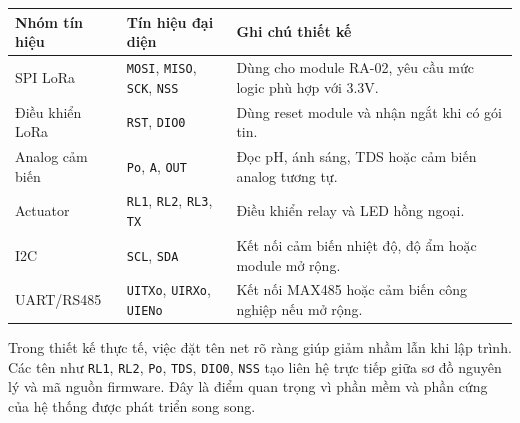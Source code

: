 \begin{longtable}{|p{3.2cm}|p{4cm}|p{5.8cm}|}
\hline
\textbf{Nhóm tín hiệu} & \textbf{Tín hiệu đại diện} & \textbf{Ghi chú thiết kế} \\
\hline
SPI LoRa & \texttt{MOSI}, \texttt{MISO}, \texttt{SCK}, \texttt{NSS} & Dùng cho module RA-02, yêu cầu mức logic phù hợp với 3.3V. \\
\hline
Điều khiển LoRa & \texttt{RST}, \texttt{DIO0} & Dùng reset module và nhận ngắt khi có gói tin. \\
\hline
Analog cảm biến & \texttt{Po}, \texttt{A}, \texttt{OUT} & Đọc pH, ánh sáng, TDS hoặc cảm biến analog tương tự. \\
\hline
Actuator & \texttt{RL1}, \texttt{RL2}, \texttt{RL3}, \texttt{TX} & Điều khiển relay và LED hồng ngoại. \\
\hline
I2C & \texttt{SCL}, \texttt{SDA} & Kết nối cảm biến nhiệt độ, độ ẩm hoặc module mở rộng. \\
\hline
UART/RS485 & \texttt{UITXo}, \texttt{UIRXo}, \texttt{UIENo} & Kết nối MAX485 hoặc cảm biến công nghiệp nếu mở rộng. \\
\hline
\end{longtable}

Trong thiết kế thực tế, việc đặt tên net rõ ràng giúp giảm nhầm lẫn khi lập trình. Các tên như \texttt{RL1}, \texttt{RL2}, \texttt{Po}, \texttt{TDS}, \texttt{DIO0}, \texttt{NSS} tạo liên hệ trực tiếp giữa sơ đồ nguyên lý và mã nguồn firmware. Đây là điểm quan trọng vì phần mềm và phần cứng của hệ thống được phát triển song song.
